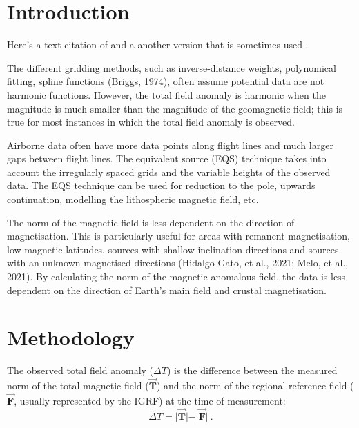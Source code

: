 
\section{Introduction}

Here's a text citation of \citet{OliveiraJr2015}
and a another version that is sometimes used \citep{OliveiraJr2015}.

The different gridding methods, such as inverse-distance weights, polynomical fitting, spline functions (Briggs, 1974), often assume potential data are not harmonic functions. However, the total field anomaly is harmonic when the magnitude is much smaller than the magnitude of the geomagnetic field; this is true for most instances in which the total field anomaly is observed. 

Airborne data often have more data points along flight lines and much larger gaps between flight lines. The equivalent source (EQS) technique takes into account the irregularly spaced grids and the variable heights of the observed data. The EQS technique can be used for reduction to the pole, upwards continuation, modelling the lithospheric magnetic field, etc.

The norm of the magnetic field is less dependent on the direction of magnetisation. This is particularly useful for areas with remanent magnetisation, low magnetic latitudes, sources with shallow inclination directions and sources with an unknown magnetised directions (Hidalgo-Gato, et al., 2021; Melo, et al., 2021). By calculating the norm of the magnetic anomalous field, the data is less dependent on the direction of Earth’s main field and crustal magnetisation.

\lipsum[1-4]



\section{Methodology}

The observed total field anomaly ($\Delta T$) is the difference between the measured norm of the total magnetic field ($\vec{\mathbf{T}}$) and the norm of the regional reference field ($\vec{\mathbf{F}}$, usually represented by the IGRF) at the time of measurement:
\begin{equation}
    \Delta T = \vert \vec{\mathbf{T}} \vert - \vert \vec{\mathbf{F}} \vert
    \ .
\end{equation}

